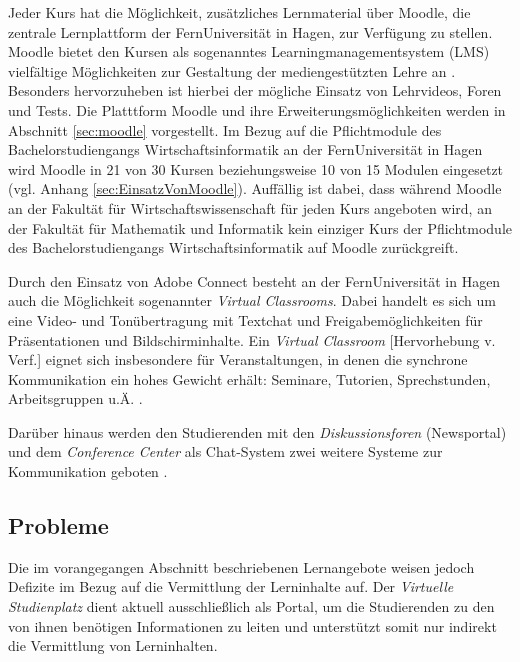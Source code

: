 Jeder Kurs hat die Möglichkeit, zusätzliches Lernmaterial über Moodle, die zentrale Lernplattform der FernUniversität in Hagen, zur Verfügung zu stellen. Moodle bietet den Kursen \glqq als sogenanntes Learningmanagementsystem (LMS) vielfältige Möglichkeiten zur Gestaltung der mediengestützten Lehre an\grqq{} \citep{fernuniversitaet2018moodle}. Besonders hervorzuheben ist hierbei der mögliche Einsatz von Lehrvideos, Foren und Tests. Die Platttform Moodle und ihre Erweiterungsmöglichkeiten werden in Abschnitt \ref{sec:moodle} vorgestellt. Im Bezug auf die Pflichtmodule des Bachelorstudiengangs Wirtschaftsinformatik an der FernUniversität in Hagen wird Moodle in 21 von 30 Kursen beziehungsweise 10 von 15 Modulen eingesetzt (vgl. Anhang \ref{sec:EinsatzVonMoodle}). Auffällig ist dabei, dass während Moodle an der Fakultät für Wirtschaftswissenschaft für jeden Kurs angeboten wird, an der Fakultät für Mathematik und Informatik kein einziger Kurs der Pflichtmodule des Bachelorstudiengangs Wirtschaftsinformatik auf Moodle zurückgreift.

Durch den Einsatz von Adobe Connect besteht an der FernUniversität in Hagen auch die Möglichkeit sogenannter \textit{Virtual Classrooms}. Dabei handelt es sich um eine Video- und Tonübertragung mit Textchat und Freigabemöglichkeiten für Präsentationen und Bildschirminhalte. \glqq Ein \emph{Virtual Classroom} [Hervorhebung v. Verf.] eignet sich insbesondere für Veranstaltungen, in denen die synchrone Kommunikation ein hohes Gewicht erhält: Seminare, Tutorien, Sprechstunden, Arbeitsgruppen u.Ä.\grqq{} \citep{fernuniversitaet2018kommunikationstools}.

Darüber hinaus werden den Studierenden mit den \textit{Diskussionsforen} (Newsportal) und dem \textit{Conference Center} als Chat-System zwei weitere Systeme zur Kommunikation geboten \citep{fernuniversitaet2018kommunikationstools}.


\subsection{Probleme}
Die im vorangegangen Abschnitt beschriebenen Lernangebote weisen jedoch Defizite im Bezug auf die Vermittlung der Lerninhalte auf. Der \textit{Virtuelle Studienplatz} dient aktuell ausschließlich als Portal, um die Studierenden zu den von ihnen benötigen Informationen zu leiten und unterstützt somit nur indirekt die Vermittlung von Lerninhalten.

